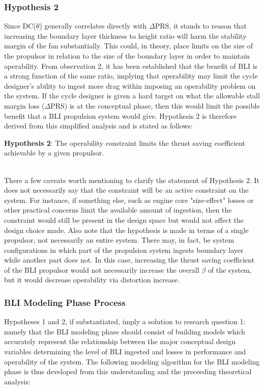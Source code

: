 			\subsubsection{Hypothesis 2}				
				Since DC($\theta$) generally correlates directly with $\Delta$PRS, it stands to reason that increasing the boundary layer thickness to height ratio will harm the stability margin of the fan substantially.  This could, in theory, place limits on the size of the propulsor in relation to the size of the boundary layer in order to maintain operability.  From observation 2, it has been established that the benefit of BLI is a strong function of the same ratio, implying that operability may limit the cycle designer's ability to ingest more drag within imposing an operability problem on the system.  If the cycle designer is given a hard target on what the allowable stall margin loss ($\Delta$PRS) is at the conceptual phase, then this would limit the possible benefit that a BLI propulsion system would give.  Hypothesis 2 is therefore derived from this simplified analysis and is stated as follows:
							
				\noindent\makebox[\linewidth]{\rule{\textwidth}{2pt}}									
					\textbf{Hypothesis 2}: The operability constraint limits the thrust saving coefficient achievable by a given propulsor.\\			 	  			
				\noindent\makebox[\linewidth]{\rule{\textwidth}{2pt}}				
				
				 There a few caveats worth mentioning to clarify the statement of Hypothesis 2.  It does not necessarily say that the constraint will be an active constraint on the system.  For instance, if something else, such as engine core "size-effect" losses or other practical concerns limit the available amount of ingestion, then the constraint would still be present in the design space but would not affect the design choice made. Also note that the hypothesis is made in terms of a single propulsor, not necessarily an entire system.  There may, in fact, be system configurations in which part of the propulsion system ingests boundary layer while another part does not.  In this case, increasing the thrust saving coefficient of the BLI propulsor would not necessarily increase the overall $\beta$ of the system, but it would decrease operability via distortion increase. 
	
			\subsubsection{BLI Modeling Phase Process}
				Hypotheses 1 and 2, if substantiated, imply a solution to research question 1:  namely that the BLI modeling phase should consist of building models which accurately represent the relationship between the major conceptual design variables determining the level of BLI ingested and losses in performance and operability of the system.  The following modeling algorithm for the BLI modeling phase is thus developed from this understanding and the preceeding theoretical analysis: 	
							
